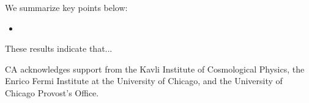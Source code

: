 \documentclass{emulateapj}
\begin{document}
We summarize key points below:

\begin{itemize}

\item 
    
\end{itemize}

These results indicate that...

\acknowledgments CA acknowledges support from the Kavli Institute of
Cosmological Physics, the Enrico Fermi Institute at the University of
Chicago, and the University of Chicago Provost's Office.
\lastpagefootnotes



\end{document}
